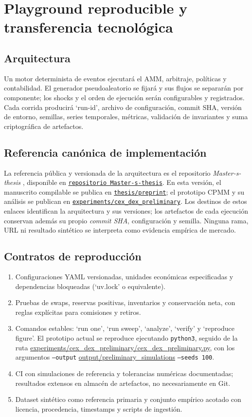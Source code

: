 \documentclass[11pt,a4paper]{article}
\begin{document}
\section{Playground reproducible y transferencia tecnológica}
\subsection{Arquitectura}
Un motor determinista de eventos ejecutará el AMM, arbitraje, políticas y contabilidad. El generador pseudoaleatorio se fijará y sus flujos se separarán por componente; los shocks y el orden de ejecución serán configurables y registrados. Cada corrida producirá `run-id', archivo de configuración, commit SHA, versión de entorno, semillas, series temporales, métricas, validación de invariantes y suma criptográfica de artefactos.

\subsection{Referencia canónica de implementación}
La referencia pública y versionada de la arquitectura es el repositorio \emph{Master-s-thesis} \cite{calderonrepo2026}, disponible en \href{https://github.com/edwardcalderon/Master-s-thesis}{\texttt{repositorio Master-s-thesis}}. En esta versión, el manuscrito compilable se publica en \href{https://github.com/edwardcalderon/Master-s-thesis/tree/main/thesis/preprint}{\texttt{thesis/preprint}}; el prototipo CPMM y su análisis se publican en \href{https://github.com/edwardcalderon/Master-s-thesis/tree/main/experiments/cex_dex_preliminary}{\texttt{experiments/cex\_dex\_preliminary}}. Los destinos de estos enlaces identifican la arquitectura y sus versiones; los artefactos de cada ejecución conservan además su propio \emph{commit SHA}, configuración y semilla. Ninguna rama, URL ni resultado sintético se interpreta como evidencia empírica de mercado.
\subsection{Contratos de reproducción}
\begin{enumerate}[leftmargin=*,itemsep=1pt]
\item Configuraciones YAML versionadas, unidades económicas especificadas y dependencias bloqueadas (`uv.lock' o equivalente).
\item Pruebas de swaps, reservas positivas, inventarios y conservación neta, con reglas explícitas para comisiones y retiros.
\item Comandos estables: `run one', `run sweep', `analyze', `verify' y `reproduce figure'. El prototipo actual se reproduce ejecutando \texttt{python3}, seguido de la ruta \url{experiments/cex_dex_preliminary/cex_dex_preliminary.py}, con los argumentos \texttt{--output} \url{output/preliminary_simulations} \texttt{--seeds 100}.
\item CI con simulaciones de referencia y tolerancias numéricas documentadas; resultados extensos en almacén de artefactos, no necesariamente en Git.
\item Dataset sintético como referencia primaria y conjunto empírico acotado con licencia, procedencia, timestamps y scripts de ingestión.
\end{enumerate}
\end{document}
